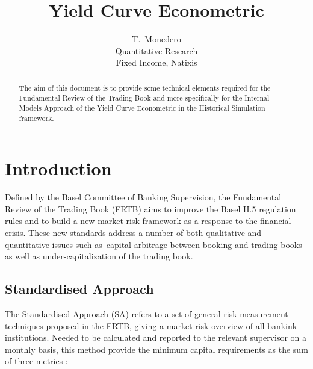 \documentclass[10pt,a4paper]{report}
\begin{document}
\title{Yield Curve Econometric}
\author{T.\ Monedero \\
Quantitative Research\\
Fixed Income, Natixis\\
}
\maketitle

\begin{abstract}
The aim of this document is to provide some technical elements required for
the Fundamental Review of the Trading Book and more specifically for the
Internal Models Approach of the Yield Curve Econometric in the Historical
Simulation framework.
\end{abstract}


\tableofcontents\newpage
\renewcommand\thesection {\Roman{section}}
\renewcommand{\thesubsubsection}{\arabic{subsubsection} }
\setlength{\footnotesep}{2em} 
\renewcommand{\footnoterule}{\hspace*{0em}\dotfill\hspace*{0em}} 



\section{Introduction}

Defined by the Basel Committee of Banking Supervision, the Fundamental
Review of the Trading Book (FRTB) aims to improve the Basel II.5 regulation
rules and to build a new market risk framework as a response to the
financial crisis. These new standards address a number of both qualitative
and quantitative issues such as\ capital arbitrage between booking and
trading books as well as under-capitalization of the trading book.

\bigskip 

\subsection{Standardised Approach}

The Standardised Approach (SA) refers to a set of general risk measurement
techniques proposed in the FRTB, giving a market risk overview of all
bankink institutions. Needed to be calculated and reported to the relevant
supervisor on a monthly basis, this method provide the minimum capital
requirements as the sum of three metrics :

\bigskip
\end{document}
